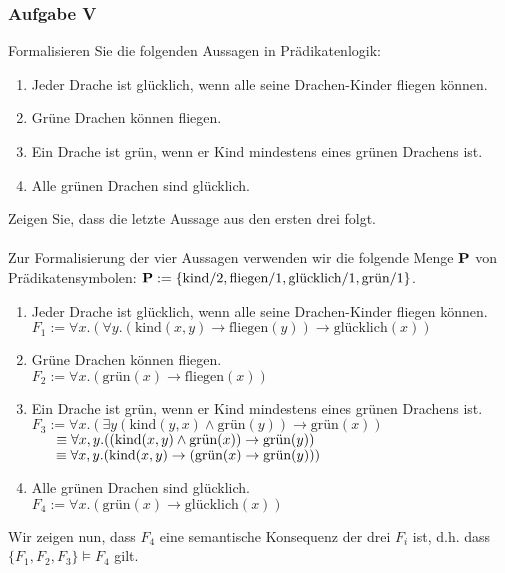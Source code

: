 \subsubsection*{Aufgabe V}
\label{REP3-V}
Formalisieren Sie die folgenden Aussagen in Prädikatenlogik:
\begin{enumerate}
\item Jeder Drache ist glücklich, wenn alle seine Drachen-Kinder fliegen können.
\item Grüne Drachen können fliegen.
\item Ein Drache ist grün, wenn er Kind mindestens eines grünen Drachens ist.
\item Alle grünen Drachen sind glücklich.
\end{enumerate}
Zeigen Sie, dass die letzte Aussage aus den ersten drei folgt. \\\\
\LOES Zur Formalisierung der vier Aussagen verwenden wir die folgende Menge $\textbf{P}$ von Prädikatensymbolen: $\textbf{P} := \{\text{kind}/2, \text{fliegen}/1, \text{glücklich}/1, \text{grün}/1 \}$. 
\begin{enumerate}
\item Jeder Drache ist glücklich, wenn alle seine Drachen-Kinder fliegen können.\\
$F_1 := \forall x.(\forall y.(\text{kind}(x,y) \to \text{fliegen}(y)) \to \text{glücklich}(x))$
\item Grüne Drachen können fliegen. \\
$F_2 := \forall x.(\text{grün}(x) \to \text{fliegen}(x))$
\item Ein Drache ist grün, wenn er Kind mindestens eines grünen Drachens ist. \\
$F_3 := \forall x.(\exists y(\text{kind}(y, x) \land \text{grün}(y)) \to \text{grün}(x))$ \\
$\phantom{F_3}\hspace{0.3em} \equiv \forall x,y.((\text{kind}(x, y) \land \text{grün}(x)) \to \text{grün}(y))$ \\
$\phantom{F_3}\hspace{0.3em} \equiv \forall x,y.(\text{kind}(x,y) \to (\text{grün}(x) \to \text{grün}(y)))$
\item Alle grünen Drachen sind glücklich. \\
$F_4 := \forall x.(\text{grün}(x) \to \text{glücklich}(x))$
\end{enumerate}
Wir zeigen nun, dass $F_4$ eine semantische Konsequenz der drei $F_i$ ist, d.h. dass $\{F_1, F_2, F_3 \} \models F_4$ gilt.
